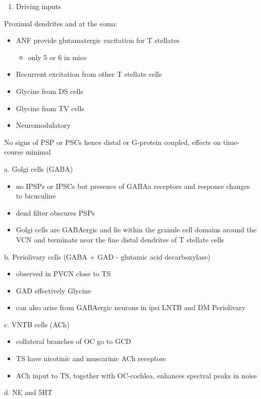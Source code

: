 \begin{enumerate}
\item Driving inputs
\end{enumerate}
Proximal dendrites and at the soma:

\begin{itemize}
\item ANF provide glutamatergic excitation for T stellates  \citep{Cant:1981,FerragamoGoldingEtAl:1998a,Alibardi:1998a}
\begin{itemize}
\item only 5 or 6 in mice \citep{FerragamoGoldingEtAl:1998a,CaoOertel:2010}
\end{itemize}
\item Recurrent excitation from other T stellate cells \citep{FerragamoGoldingEtAl:1998a}
\item Glycine from DS cells \citep{FerragamoGoldingEtAl:1998a}
\item Glycine from TV cells \citep{WickesbergOertel:1990,ZhangOertel:1993b}
\item Neuromodulatory
\end{itemize}
     No signs of PSP or PSCs hence distal or G-protein coupled, effects on time-course minimal
     
a. Golgi cells (GABA)

\begin{itemize}
\item no IPSPs or IPSCs but presence of GABAa receptors and response changes to bicuculine \citep{WuOertel:1986,OertelWickesberg:1993,FerragamoGoldingEtAl:1998a}
\item dend filter obscures PSPs
\item Golgi cells are GABAergic and lie within the granule cell domains around the VCN and terminate near the fine distal dendrites of T stellate cells
\end{itemize}
b. Periolivary cells (GABA + GAD - glutamic acid decarboxylase) 

\begin{itemize}
\item observed in PVCN close to TS \citep{AdamsMugnaini:1987}
\item GAD effectively Glycine \citep{GoldingOertel:1997}
\item can also arise from GABAergic neurons in ipsi LNTB and DM Periolivary
\end{itemize}
c. VNTB cells (ACh)

\begin{itemize}
\item collateral branches of OC go to GCD \citep{MellottMottsEtAl:2011,SherriffHenderson:1994,OsenRoth:1969}
\item TS have nicotinic and muscarinic ACh receptors \citep{FujinoOertel:2001}
\item ACh input to TS, together with OC-cochlea, enhances spectral peaks in noise  \citep{FujinoOertel:2001}
\end{itemize}
d. NE and 5HT

